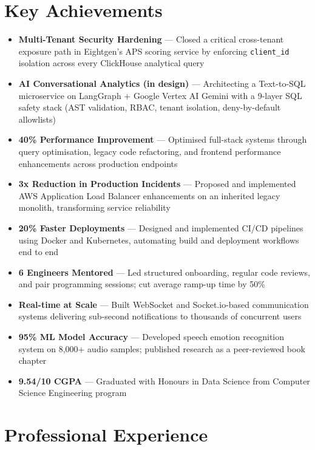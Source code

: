\documentclass[a4paper,11.5pt]{article}
\newcommand{\h}[1]{\textbf{\textcolor{hgray}{#1}}}
\begin{document}
\section*{Key Achievements}
\begin{itemize}
  \item \h{Multi-Tenant Security Hardening} — Closed a critical cross-tenant exposure path in Eightgen's APS scoring service by enforcing \texttt{client\_id} isolation across every ClickHouse analytical query
  \item \h{AI Conversational Analytics (in design)} — Architecting a Text-to-SQL microservice on LangGraph + Google Vertex AI Gemini with a 9-layer SQL safety stack (AST validation, RBAC, tenant isolation, deny-by-default allowlists)
  \item \h{40\% Performance Improvement} — Optimised full-stack systems through query optimisation, legacy code refactoring, and frontend performance enhancements across production endpoints
  \item \h{3x Reduction in Production Incidents} — Proposed and implemented AWS Application Load Balancer enhancements on an inherited legacy monolith, transforming service reliability
  \item \h{20\% Faster Deployments} — Designed and implemented CI/CD pipelines using Docker and Kubernetes, automating build and deployment workflows end to end
  \item \h{6 Engineers Mentored} — Led structured onboarding, regular code reviews, and pair programming sessions; cut average ramp-up time by 50\%
  \item \h{Real-time at Scale} — Built WebSocket and Socket.io-based communication systems delivering sub-second notifications to thousands of concurrent users
  \item \h{95\% ML Model Accuracy} — Developed speech emotion recognition system on 8,000+ audio samples; published research as a peer-reviewed book chapter
  \item \h{9.54/10 CGPA} — Graduated with Honours in Data Science from Computer Science Engineering program
\end{itemize}

\vspace{0.4em}

\section*{Professional Experience}
\end{document}
